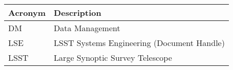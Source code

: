 \addtocounter{table}{-1}
\begin{longtable}{p{}p{}}\hline
\textbf{Acronym} & \textbf{Description}  \\\hline

DM & Data Management \\\hline
LSE & LSST Systems Engineering (Document Handle) \\\hline
LSST & Large Synoptic Survey Telescope \\\hline
\end{longtable}
